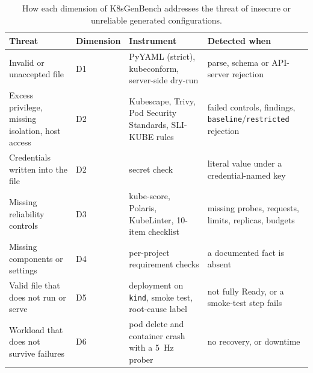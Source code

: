 \begin{table}[t]
\centering\small
\caption{How each dimension of K8sGenBench addresses the threat of insecure or unreliable generated configurations.}\label{tab:threat-map}
\begin{tabular}{p{}p{}p{}p{}}
\toprule
Threat & Dimension & Instrument & Detected when \\ \midrule
Invalid or unaccepted file & D1 & PyYAML (strict), kubeconform, server-side dry-run & parse, schema or API-server rejection \\
Excess privilege, missing isolation, host access & D2 & Kubescape, Trivy, Pod Security Standards, SLI-KUBE rules & failed controls, findings, \texttt{baseline}/\texttt{restricted} rejection \\
Credentials written into the file & D2 & secret check & literal value under a credential-named key \\
Missing reliability controls & D3 & kube-score, Polaris, KubeLinter, 10-item checklist & missing probes, requests, limits, replicas, budgets \\
Missing components or settings & D4 & per-project requirement checks & a documented fact is absent \\
Valid file that does not run or serve & D5 & deployment on \texttt{kind}, smoke test, root-cause label & not fully Ready, or a smoke-test step fails \\
Workload that does not survive failures & D6 & pod delete and container crash with a 5~Hz prober & no recovery, or downtime \\
\bottomrule
\end{tabular}
\end{table}
